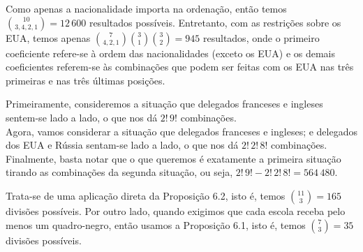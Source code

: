 \begin{questions}
\setcounter{question}{28}
\begin{solution}
Como apenas a nacionalidade importa na ordenação, então temos $\binom{10}{3,4,2,1} = 12\,600$ resultados possíveis. Entretanto, com as restrições sobre os EUA, temos apenas $\binom{7}{4,2,1}\binom{3}{1}\binom{3}{2} = 945$ resultados, onde o primeiro coeficiente refere-se à ordem das nacionalidades (exceto os EUA) e os demais coeficientes referem-se às combinações que podem ser feitas com os EUA nas três primeiras e nas três últimas posições.
\end{solution}

\begin{solution}
Primeiramente, consideremos a situação que delegados franceses e ingleses sentem-se lado a lado, o que nos dá $2!\,9!$ combinações.\\
Agora, vamos considerar a situação que delegados franceses e ingleses; e delegados dos EUA e Rússia sentam-se lado a lado, o que nos dá $2!\,2!\,8!$ combinações.\\
Finalmente, basta notar que o que queremos é exatamente a primeira situação tirando as combinações da segunda situação, ou seja, $2!\,9! - 2!\,2!\,8! = 564\,480$.
\end{solution}

\begin{solution}
Trata-se de uma aplicação direta da Proposição 6.2, isto é, temos $\binom{11}{3} = 165$ divisões possíveis. Por outro lado, quando exigimos que cada escola receba pelo menos um quadro-negro, então usamos a Proposição 6.1, isto é, temos $\binom{7}{3} = 35$ divisões possíveis.
\end{solution}

\end{questions}
